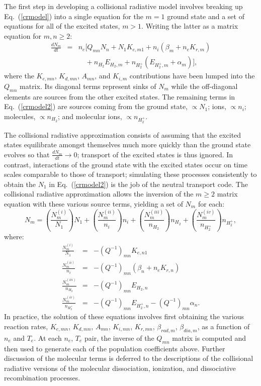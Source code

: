\documentclass[12pt]{report}
\begin{document}
The first step in developing a collisional radiative model involves
breaking up Eq.~(\ref{crmodel}) into a single equation for the $m=1$ ground state
and a set of equations for all of the excited states, $m > 1$.
Writing the latter as a matrix
equation for $m, n \geq 2$: 
\begin{eqnarray}
\frac{d N_{m}}{dt} & = & n_{e} [ Q_{mn} N_{n} + N_{1} K_{e,m1}
+ n_{i} (\beta_{m} + n_{e} K_{r,m}) \nonumber \\
& & \quad + n_{H_{2}} E_{H_{2},m} +  n_{H_{2}^{+}}(E_{H_{2}^+,m} + \alpha_{m}) ],
\label{crmodel2}
\end{eqnarray}
where the $K_{e,mn}$, $K_{d,mn}$, $A_{mn}$, and $K_{i,m}$ contributions
have been lumped into the $Q_{mn}$ matrix.
Its diagonal terms represent
sinks of $N_{m}$ while the off-diagonal elements are sources
from the other excited states.  The remaining terms in Eq.~(\ref{crmodel2})
are sources coming from the ground state, $\propto N_{1}$; ions,
$\propto n_{i}$; molecules, $\propto n_{H_{2}}$; and molecular ions,
$\propto n_{H_{2}^{+}}$.

The collisional radiative approximation\cite{Bate61,McWh65} consists of assuming
that the excited states equilibrate amongst themselves much more
quickly than the ground state evolves so that
$\frac{d N_{m}}{dt} \rightarrow 0$; 
transport of the excited states is thus ignored.
In contrast, interactions of the ground state with the excited states
occur on time scales comparable to those of transport;
simulating these processes consistently to obtain the
$N_{1}$ in Eq.~(\ref{crmodel2})
is the job of the neutral transport
code.
The collisional radiative approximation allows the inversion of the
$m \geq 2$ matrix equation with these various source
terms, yielding a set of $N_{m}$ for each:  
\begin{equation}
N_{m} = \left( \frac{N^{(i)}_{m}}{N_{1}}\right) N_{1} + 
\left( \frac{N^{(ii)}_{m}}{n_{i}}\right) n_{i}
+ \left( \frac{N^{(iii)}_{m}}{n_{H_{2}}}\right) n_{H_{2}}
+ \left( \frac{N^{(iv)}_{m}}{n_{H_{2}^{+}}}\right) n_{H_{2}^{+}},
\label{crnm}
\end{equation}
where:
\begin{eqnarray}
  \frac{N^{(i)}_{m}}{N_{1}} & = &  - (Q^{-1})_{mn} K_{e,n1}   \\
  \frac{N^{(ii)}_{m}}{n_{i}} & = & - (Q^{-1})_{mn}  (\beta_{n} + n_{e} K_{r,n})    \\
  \frac{N^{(iii)}_{m}}{n_{H_{2}}} & = & - (Q^{-1})_{mn} E_{H_{2},n}  \\
  \frac{N^{(iv)}_{m}}{n_{H_{2}^{+}}} & = & - (Q^{-1})_{mn} E_{H_{2}^+,n}
                                           - (Q^{-1})_{mn} \alpha_{n}.
\end{eqnarray}
In practice, the solution of these equations involves first
obtaining the various reaction rates,  $K_{e,mn}$,
$K_{d,mn}$, $A_{mn}$, $K_{i,mn}$, $K_{r,mn}$, $\beta_{rad,m}$, $\beta_{dia,m}$,
as a function of $n_{e}$ and $T_{e}$.
At each $n_{e}$, $T_{e}$ pair, the inverse of the $Q_{mn}$ matrix is
computed and then used to generate each of the population
coefficients above.  Further discussion of the molecular terms
is deferred to the descriptions of the collisional radiative
versions of the molecular dissociation, ionization, and
dissociative recombination processes.
\end{document}
